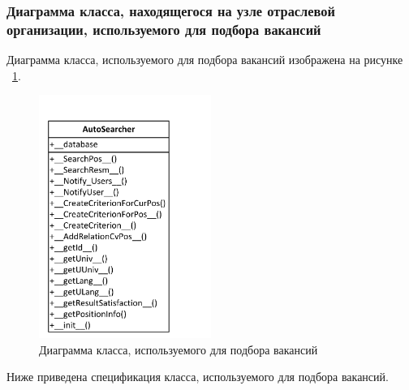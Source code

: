 \subsubsection{Диаграмма класса, находящегося на узле отраслевой организации, используемого для подбора вакансий}
Диаграмма класса, используемого для подбора вакансий изображена на рисунке ~\ref{fig:Visio-asch-uml}.  
\begin{figure}[ht!]
\centering
 \includegraphics[width=0.5\textwidth]{include/Visio-asch-uml.pdf}
\caption{Диаграмма класса, используемого для подбора вакансий}
\label{fig:Visio-asch-uml}
\end{figure}

Ниже приведена спецификация класса, используемого для подбора вакансий.


